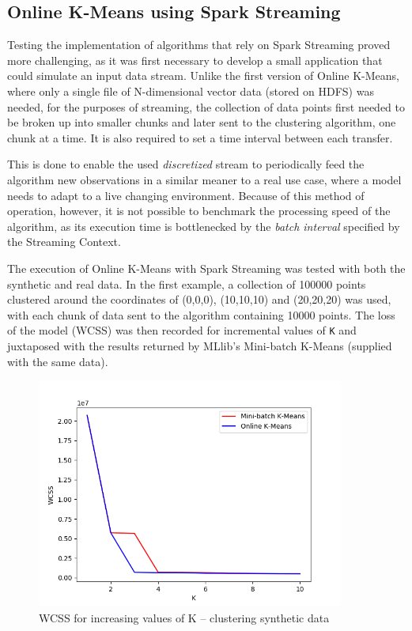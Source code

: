 \documentclass{l4proj}
\begin{document}
\subsection{Online K-Means using Spark Streaming}

Testing the implementation of algorithms that rely on Spark Streaming proved more challenging, as it was first necessary to develop a small application that could simulate an input data stream. Unlike the first version of Online K-Means, where only a single file of N-dimensional vector data (stored on HDFS) was needed, for the purposes of streaming, the collection of data points first needed to be broken up into smaller chunks and later sent to the clustering algorithm, one chunk at a time. It is also required to set a time interval between each transfer.

This is done to enable the used \textit{discretized} stream to periodically feed the algorithm new observations in a similar meaner to a real use case, where a model needs to adapt to a live changing environment. Because of this method of operation, however, it is not possible to benchmark the processing speed of the algorithm, as its execution time is bottlenecked by the \textit{batch interval} specified by the Streaming Context.
 
The execution of Online K-Means with Spark Streaming was tested with both the synthetic and real data. In the first example, a collection of 100000 points clustered around the coordinates of (0,0,0), (10,10,10) and (20,20,20) was used, with each chunk of data sent to the algorithm containing 10000 points. The loss of the model (WCSS) was then recorded for incremental values of \texttt{K} and juxtaposed with the results returned by MLlib's Mini-batch K-Means (supplied with the same data).

\begin{figure}[H]
	\centering
    \label{fig:res10}
    \includegraphics[width=0.9\textwidth]{images/result10}
    \caption{WCSS for increasing values of K -- clustering synthetic data} 
\end{figure}
\end{document}
